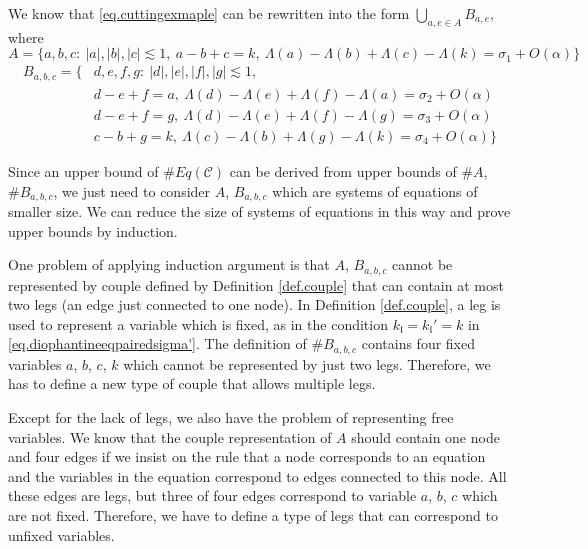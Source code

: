 We know that \eqref{eq.cuttingexmaple} can be rewritten into the form $\bigcup_{a,e\in A} B_{a,e}$, where
\begin{equation}\label{eq.couplequationA}
    A=\{a, b, c:\ |a|,|b|,|c|\lesssim 1,\ a - b + c = k,\ \Lambda(a) - \Lambda(b) + \Lambda(c) - \Lambda(k) =\sigma_{1} + O(\alpha)\}
\end{equation}
\begin{equation}\label{eq.couplequationB}
    \begin{split}
        B_{a,b,c}=\{&d, e, f, g:\ |d|,|e|,|f|,|g|\lesssim 1,
        \\
        &d - e + f = a,\ \Lambda(d) - \Lambda(e) + \Lambda(f) - \Lambda(a) =\sigma_{2} + O(\alpha)
        \\
        &d - e + f = g,\ \Lambda(d) - \Lambda(e) + \Lambda(f) - \Lambda(g) =\sigma_{3} + O(\alpha)
        \\
        &c - b + g = k,\ \Lambda(c) - \Lambda(b) + \Lambda(g) - \Lambda(k)  =\sigma_{4} + O(\alpha)\}
    \end{split}    
\end{equation}

Since an upper bound of $\# Eq(\mathcal{C})$ can be derived from upper bounds of $\# A$, $\# B_{a,b,c}$, we just need to consider $A$, $B_{a,b,c}$ which are systems of equations of smaller size. We can reduce the size of systems of equations in this way and prove upper bounds by induction.

One problem of applying induction argument is that $A$, $B_{a,b,c}$ cannot be represented by couple defined by Definition \ref{def.couple} that can contain at most two legs (an edge just connected to one node). In Definition \ref{def.couple}, a leg is used to represent a variable which is fixed, as in the condition $k_{\mathfrak{l}} = k_{\mathfrak{l}}'= k$ in \eqref{eq.diophantineeqpairedsigma'}. The definition of $\# B_{a,b,c}$ contains four fixed variables $a$, $b$, $c$, $k$ which cannot be represented by just two legs. Therefore, we has to define a new type of couple that allows multiple legs.

Except for the lack of legs, we also have the problem of representing free variables. We know that the couple representation of $A$ should contain one node and four edges if we insist on the rule that a node corresponds to an equation and the variables in the equation correspond to edges connected to this node. All these edges are legs, but three of four edges correspond to variable $a$, $b$, $c$ which are not fixed. Therefore, we have to define a type of legs that can correspond to unfixed variables.

